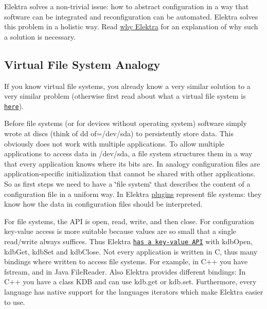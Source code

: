 Elektra solves a non-\/trivial issue\+: how to abstract configuration in a way that software can be integrated and reconfiguration can be automated. Elektra solves this problem in a holistic way. Read \hyperlink{doc_WHY_md}{why Elektra} for an explanation of why such a solution is necessary.

\subsection*{Virtual File System Analogy}

If you know virtual file systems, you already know a very similar solution to a very similar problem (otherwise first read about what a virtual file system is \href{https://en.wikipedia.org/wiki/Virtual_file_system}{\tt here}).

Before file systems (or for devices without operating system) software simply wrote at discs (think of {\ttfamily dd of=/dev/sda}) to persistently store data. This obviously does not work with multiple applications. To allow multiple applications to access data in {\ttfamily /dev/sda}, a file system structures them in a way that every application knows where its bits are. In analogy configuration files are application-\/specific initialization that cannot be shared with other applications. So as first steps we need to have a \char`\"{}file system\char`\"{} that describes the content of a configuration file in a uniform way. In Elektra \hyperlink{src_plugins_README_md}{plugins} represent file systems\+: they know how the data in configuration files should be interpreted.

For file systems, the A\+PI is {\ttfamily open}, {\ttfamily read}, {\ttfamily write}, and then {\ttfamily close}. For configuration key-\/value access is more suitable because values are so small that a single read/write always suffices. Thus Elektra \href{https://doc.libelektra.org/api/current/html}{\tt has a key-\/value A\+PI} with {\ttfamily kdb\+Open}, {\ttfamily kdb\+Get}, {\ttfamily kdb\+Set} and {\ttfamily kdb\+Close}. Not every application is written in C, thus many {\ttfamily bindings} where written to access file systems. For example, in C++ you have {\ttfamily fstream}, and in Java {\ttfamily File\+Reader}. Also Elektra provides different bindings\+: In C++ you have a class {\ttfamily K\+DB} and can use {\ttfamily kdb.\+get} or {\ttfamily kdb.\+set}. Furthermore, every language has native support for the language\textquotesingle{}s iterators which make Elektra easier to use.

